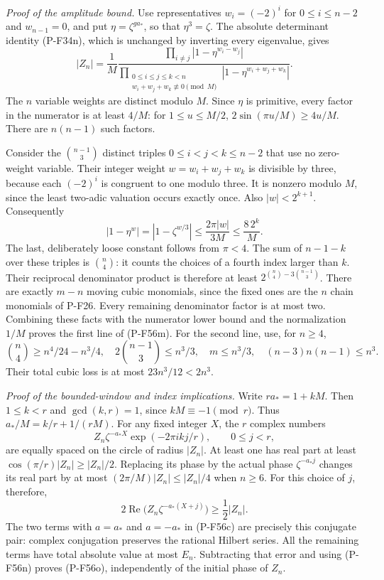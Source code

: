 \emph{Proof of the amplitude bound.}
Use representatives
$w_i=(-2)^i$ for $0\le i\le n-2$ and $w_{n-1}=0$,
and put $\eta=\zeta^{ga_*}$, so that $\eta^3=\zeta$.
The absolute determinant identity (P-F34n), which is unchanged
by inverting every eigenvalue, gives
\[
 |Z_n|=\frac1M
 \frac{\displaystyle\prod_{i\ne j}|1-\eta^{w_i-w_j}|}
      {\displaystyle\prod_{\substack{0\le i\le j\le k<n\\
                     w_i+w_j+w_k\not\equiv0\pmod M}}
                        |1-\eta^{w_i+w_j+w_k}|}.
 \tag{P-F56q}
\]
The $n$ variable weights are distinct modulo $M$.
Since $\eta$ is primitive, every factor in the numerator
is at least $4/M$: for $1\le u\le M/2$,
$2\sin(\pi u/M)\ge4u/M$.
There are $n(n-1)$ such factors.

Consider the $\binom{n-1}3$ distinct triples
$0\le i<j<k\le n-2$ that use no zero-weight variable.
Their integer weight
$w=w_i+w_j+w_k$ is divisible by three, because each
$(-2)^i$ is congruent to one modulo three.
It is nonzero modulo $M$, since the least two-adic
valuation occurs exactly once.
Also $|w|<2^{k+1}$. Consequently
\[
 |1-\eta^w|
   =|1-\zeta^{w/3}|
   \le\frac{2\pi|w|}{3M}
   \le\frac{8\,2^k}{M}.
 \tag{P-F56r}
\]
The last, deliberately loose constant follows from $\pi<4$.
The sum of $n-1-k$ over these triples is $\binom n4$:
it counts the choices of a fourth index larger than $k$.
Their reciprocal denominator product is therefore at least
$2^{\binom n4-3\binom{n-1}3}$.
There are exactly $m-n$ moving cubic monomials, since the
fixed ones are the $n$ chain monomials of P-F26.
Every remaining denominator factor is at most two.
Combining these facts with the numerator lower bound and
the normalization $1/M$ proves the first line of (P-F56m).
For the second line, use, for $n\ge4$,
\[
 \binom n4\ge n^4/24-n^3/4,\quad
 2\binom{n-1}3\le n^3/3,\quad
 m\le n^3/3,\quad
 (n-3)n(n-1)\le n^3.
 \]
Their total cubic loss is at most $23n^3/12<2n^3$.

\emph{Proof of the bounded-window and index implications.}
Write $ra_*=1+kM$. Then $1\le k<r$ and
$\gcd(k,r)=1$, since $kM\equiv-1\pmod r$.
Thus
$a_*/M=k/r+1/(rM)$.
For any fixed integer $X$, the $r$ complex numbers
\[
 Z_n\zeta^{-a_*X}\exp(-2\pi i k j/r),
                   \qquad 0\le j<r,
 \]
are equally spaced on the circle of radius $|Z_n|$.
At least one has real part at least
$\cos(\pi/r)|Z_n|\ge |Z_n|/2$.
Replacing its phase by the actual phase
$\zeta^{-a_*j}$ changes its real part by at most
$(2\pi/M)|Z_n|\le |Z_n|/4$ when $n\ge6$.
For this choice of $j$, therefore,
\[
 2\operatorname{Re}
        \bigl(Z_n\zeta^{-a_*(X+j)}\bigr)
                         \ge\frac12|Z_n|.
 \tag{P-F56s}
\]
The two terms with $a=a_*$ and $a=-a_*$
in (P-F56c) are precisely this conjugate pair:
complex conjugation preserves the rational Hilbert series.
All the remaining terms have total absolute value at most
$E_n$. Subtracting that error and using (P-F56n) proves
(P-F56o), independently of the initial phase of $Z_n$.

